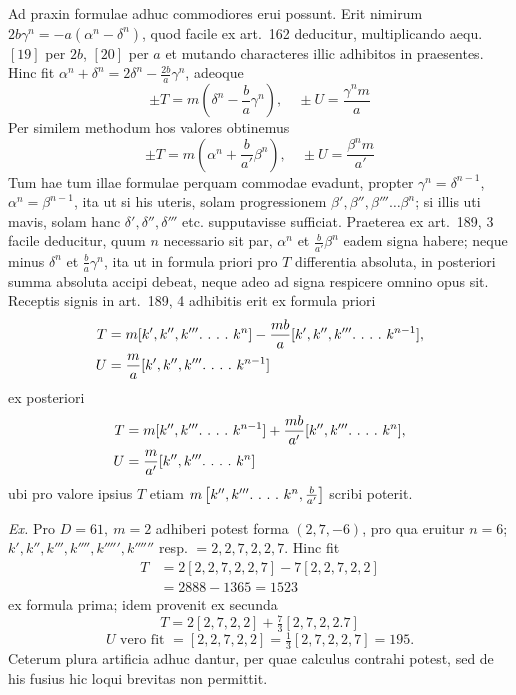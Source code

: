 Ad praxin formulae adhuc commodiores erui possunt. Erit nimirum \(2b\gamma^n=-a(\alpha^n-\delta^n)\), quod facile ex art.~162 deducitur, multiplicando aequ.~\([19]\) per \(2b\), \([20]\) per \(a\) et mutando characteres illic adhibitos in praesentes. Hinc fit \(\alpha^n+\delta^n=2\delta^n-\frac{2b}{a}\gamma^n\), adeoque
\[
\pm T=m\left(\delta^n-\frac{b}{a}\gamma^n\right),\quad \pm U=\frac{\gamma^n m}{a}
\]
Per similem methodum hos valores obtinemus
\[
\pm T=m\left(\alpha^n+\frac{b}{a'}\beta^n\right),\quad \pm U=\frac{\beta^n m}{a'}
\]
Tum hae tum illae formulae perquam commodae evadunt, propter \(\gamma^n=\delta^{n-1}\), \(\alpha^n=\beta^{n-1}\), ita ut si his uteris, solam progressionem \(\beta',\beta'',\beta'''\ldots\beta^n\); si illis uti mavis, solam hanc \(\delta',\delta'',\delta'''\) etc. supputavisse sufficiat. Praeterea ex art.~189, 3 facile deducitur, quum \(n\) necessario sit par, \(\alpha^n\) et \(\frac{b}{a'}\beta^n\) eadem signa habere; neque minus \(\delta^n\) et \(\frac{b}{a}\gamma^n\), ita ut in formula priori pro \(T\) differentia absoluta, in posteriori summa absoluta accipi debeat, neque adeo ad signa respicere omnino opus sit. Receptis signis in art.~189, 4 adhibitis erit ex formula priori
\[
\begin{aligned}T&=m[k',k'',k'''\ldotp\,\ldotp\,\ldotp\,\ldotp\, k^n]-\frac{mb}{a}[k',k'',k'''\ldotp\,\ldotp\,\ldotp\,\ldotp\, k^{n-1}],\\U&=\frac{m}{a}[k',k'',k'''\ldotp\,\ldotp\,\ldotp\,\ldotp\, k^{n-1}]\end{aligned}
\]
ex posteriori
\[
\begin{aligned}T&=m[k'',k'''\ldotp\,\ldotp\,\ldotp\,\ldotp\, k^{n-1}]+\frac{mb}{a'}[k'',k'''\ldotp\,\ldotp\,\ldotp\,\ldotp\, k^n],\\U&=\frac{m}{a'}[k'',k'''\ldotp\,\ldotp\,\ldotp\,\ldotp\, k^n]\end{aligned}
\]
ubi pro valore ipsius \(T\) etiam \(m\left[k'',k'''\ldotp\,\ldotp\,\ldotp\,\ldotp\, k^n,\frac{b}{a'}\right]\) scribi poterit.

\textit{Ex.} Pro \(D=61,\ m=2\) adhiberi potest forma \((2,7,-6)\), pro qua eruitur \(n=6\); \(k',k'',k''',k'''',k''''',k''''''\) resp. \(=2,2,7,2,2,7\). Hinc fit
\[
\begin{aligned}T&=2[2,2,7,2,2,7]-7[2,2,7,2,2]\\&=2888-1365=1523\end{aligned}
\]
ex formula prima; idem provenit ex secunda
\[
T=2[2,7,2,2]+\tfrac73[2,7,2,2.7]
\]
\[
U\text{ vero fit }=[2,2,7,2,2]=\tfrac13[2,7,2,2,7]=195.
\]
Ceterum plura artificia adhuc dantur, per quae calculus contrahi potest, sed de his fusius hic loqui brevitas non permittit.

